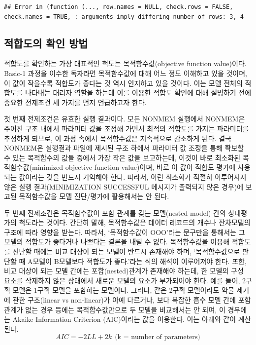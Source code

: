 \documentclass[
  10pt,
  krantz2,
  a4paper]{krantz}
\theoremstyle{definition}
\theoremstyle{definition}
\theoremstyle{definition}
\theoremstyle{remark}
\begin{document}
\begin{verbatim}
## Error in (function (..., row.names = NULL, check.rows = FALSE, check.names = TRUE, : arguments imply differing number of rows: 3, 4
\end{verbatim}

\hypertarget{uxc801uxd569uxb3c4uxc758-uxd655uxc778-uxbc29uxbc95}{%
\subsection{적합도의 확인 방법}\label{uxc801uxd569uxb3c4uxc758-uxd655uxc778-uxbc29uxbc95}}

적합도를 확인하는 가장 대표적인 척도는 목적함수값(objective function value)이다. Basic-1 과정을 이수한 독자라면 목적함수값에 대해 어느 정도 이해하고 있을 것이며, 이 값이 작을수록 적합도가 좋다는 것 역시 인지하고 있을 것이다. 이는 모델 전체의 적합도를 나타내는 대리자 역할을 하는데 이를 이용한 적합도 확인에 대해 설명하기 전에 중요한 전제조건 세 가지를 먼저 언급하고자 한다.

첫 번째 전제조건은 유효한 실행 결과이다. 모든 NONMEM 실행에서 NONMEM은 주어진 구조 내에서 파라미터 값을 조정해 가면서 최적의 적합도를 가지는 파라미터를 추정하게 되므로, 이 과정 속에서 목적함수값은 지속적으로 감소하게 된다. 결국 NONMEM은 실행결과 파일에 제시된 구조 하에서 파라미터 값 조정을 통해 확보할 수 있는 목적함수의 값들 중에서 가장 작은 값을 보고하는데, 이것이 바로 최소화된 목적함수값(minimized objective function value)이며, 바로 이 값이 적합도 평가에 사용되는 값이라는 것을 반드시 기억해야 한다. 따라서, 이런 최소화가 적절히 이루어지지 않은 실행 결과(MINIMIZATION SUCCESSFUL 메시지가 출력되지 않은 경우)에 보고된 목적함수값을 모델 진단/평가에 활용해서는 안 된다.

두 번째 전제조건은 목적함수값이 포함 관계를 갖는 모델(nested model) 간의 상대평가의 척도라는 것이다. 간단히 말해, 목적함수값은 데이터 레코드의 개수나 잔차모델의 구조에 따라 영향을 받는다. 따라서, `목적함수값이 OOO'라는 문구만을 통해서는 그 모델의 적합도가 좋다거나 나쁘다는 결론을 내릴 수 없다. 목적함수값을 이용해 적합도를 진단할 때에는 비교 대상이 되는 모델이 반드시 존재해야 하며, `목적함수값으로 판단할 때 A모델이 B모델보다 적합도가 좋다.'라는 식의 해석이 이루어져야 한다. 또한, 비교 대상이 되는 모델 간에는 포함(nested)관계가 존재해야 하는데, 한 모델의 구성 요소를 삭제하지 않은 상태에서 새로운 모델의 요소가 부가되어야 한다. 예를 들어, 2구획 모델은 1구획 모델을 포함하는 모델이다. 그러나, 같은 2구획 모델이라도 약물 제거에 관한 구조(linear vs non-linear)가 아예 다르거나, 보다 복잡한 흡수 모델 간에 포함 관계가 없는 경우 등에는 목적함수값만으로 두 모델을 비교해서는 안 되며, 이 경우에는 Akaike Information Criterion (AIC)이라는 값을 이용한다. 이는 아래와 같이 계산된다.
\begin{equation}
AIC = -2LL + 2k \ \ \text{(k = number of parameters)}
\label{eq:aic}
\end{equation}
\end{document}

